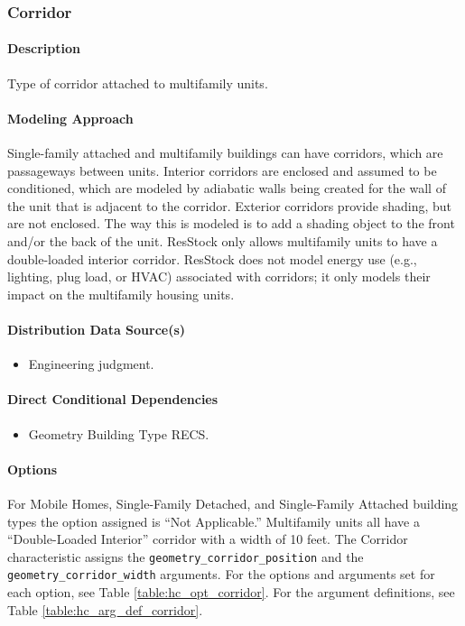 \subsubsection{Corridor}
\paragraph{Description}
Type of corridor attached to multifamily units.

\paragraph{Modeling Approach}
Single-family attached and multifamily buildings can have corridors, which are passageways between units. Interior corridors are enclosed and assumed to be conditioned, which are modeled by adiabatic walls being created for the wall of the unit that is adjacent to the corridor. Exterior corridors provide shading, but are not enclosed. The way this is modeled is to add a shading object to the front and/or the back of the unit. ResStock only allows multifamily units to have a double-loaded interior corridor. ResStock does not model energy use (e.g., lighting, plug load, or HVAC) associated with corridors; it only models their impact on the multifamily housing units.
 
\paragraph{Distribution Data Source(s)}
\begin{itemize}
    \item Engineering judgment.
\end{itemize}

\paragraph{Direct Conditional Dependencies}
\begin{itemize}
    \item Geometry Building Type RECS.
\end{itemize}
\paragraph{Options}
For Mobile Homes, Single-Family Detached, and Single-Family Attached building types the option assigned is ``Not Applicable.'' Multifamily units all have a ``Double-Loaded Interior'' corridor with a width of 10 feet. The Corridor characteristic assigns the \texttt{geometry\_corridor\_position} and the \texttt{geometry\_corridor\_width} arguments. For the options and arguments set for each option, see Table \ref{table:hc_opt_corridor}. For the argument definitions, see Table \ref{table:hc_arg_def_corridor}.




